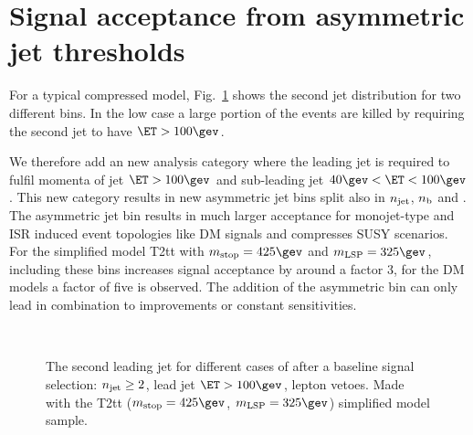\section{Signal acceptance from asymmetric jet \Pt thresholds}

For a typical compressed model, Fig.~\ref{fig:asymMotivation} shows
the second jet \PT distribution for two different \HT bins. In the low
\HT case a large portion of the events are killed by requiring the
second jet to have $\ET>100\gev$.

We therefore add an new analysis category where the leading jet is
required to fulfil momenta of jet $\ET>100\gev$ and sub-leading jet
$40\gev<\ET<100\gev$. This new category results in new asymmetric jet
bins split also in $n_{\text{jet}}$, $n_{\text{b}}$ and \HT. The asymmetric jet bin
results in much larger acceptance for monojet-type and ISR induced
event topologies like DM signals and compresses SUSY scenarios.  For
the simplified model T2tt with $m_{\rm stop}=425\gev$ and $m_{\rm
  LSP}=325\gev$, including these bins increases signal acceptance by
around a factor 3, for the DM models a factor of five is observed.
The addition of the asymmetric bin can only lead in combination to
improvements or constant sensitivities.

\begin{figure}[h!]
  \centering
  ~~
  \\
  \caption{\label{fig:asymMotivation} The second leading jet \PT for
    different cases of \HT after a baseline signal selection:
    $n_{\text{jet}}\geq2$, lead jet $\ET>100\gev$, lepton vetoes. Made with the
    T2tt ($m_{\rm stop}=425\gev$, $m_{\rm LSP}=325\gev$) simplified
    model sample.}
\end{figure}
